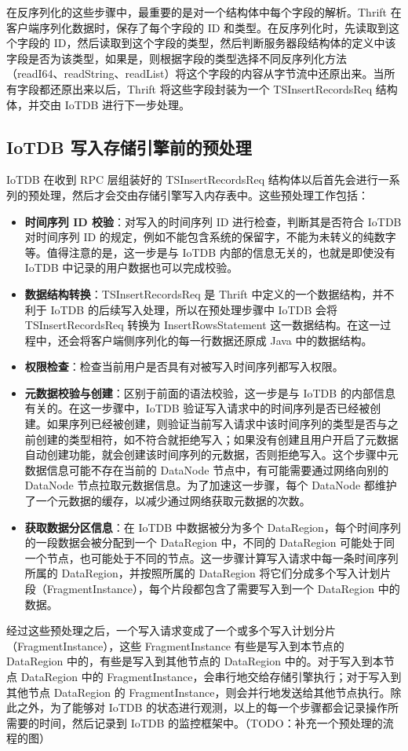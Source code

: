 在反序列化的这些步骤中，最重要的是对一个结构体中每个字段的解析。Thrift 在客户端序列化数据时，保存了每个字段的 ID 和类型。在反序列化时，先读取到这个字段的 ID，然后读取到这个字段的类型，然后判断服务器段结构体的定义中该字段是否为该类型，如果是，则根据字段的类型选择不同反序列化方法（readI64、readString、readList）将这个字段的内容从字节流中还原出来。当所有字段都还原出来以后，Thrift 将这些字段封装为一个 TSInsertRecordsReq 结构体，并交由 IoTDB 进行下一步处理。
\subsection{IoTDB 写入存储引擎前的预处理}
IoTDB 在收到 RPC 层组装好的 TSInsertRecordsReq 结构体以后首先会进行一系列的预处理，然后才会交由存储引擎写入内存表中。这些预处理工作包括：
\begin{itemize}
  \item \textbf{时间序列 ID 校验}：对写入的时间序列 ID 进行检查，判断其是否符合 IoTDB 对时间序列 ID 的规定，例如不能包含系统的保留字，不能为未转义的纯数字等。值得注意的是，这一步是与 IoTDB 内部的信息无关的，也就是即使没有 IoTDB 中记录的用户数据也可以完成校验。
  \item \textbf{数据结构转换}：TSInsertRecordsReq 是 Thrift 中定义的一个数据结构，并不利于 IoTDB 的后续写入处理，所以在预处理步骤中 IoTDB 会将 TSInsertRecordsReq 转换为 InsertRowsStatement 这一数据结构。在这一过程中，还会将客户端侧序列化的每一行数据还原成 Java 中的数据结构。
  \item \textbf{权限检查}：检查当前用户是否具有对被写入时间序列都写入权限。
  \item \textbf{元数据校验与创建}：区别于前面的语法校验，这一步是与 IoTDB 的内部信息有关的。在这一步骤中，IoTDB 验证写入请求中的时间序列是否已经被创建。如果序列已经被创建，则验证当前写入请求中该时间序列的类型是否与之前创建的类型相符，如不符合就拒绝写入；如果没有创建且用户开启了元数据自动创建功能，就会创建该时间序列的元数据，否则拒绝写入。这个步骤中元数据信息可能不存在当前的 DataNode 节点中，有可能需要通过网络向别的 DataNode 节点拉取元数据信息。为了加速这一步骤，每个 DataNode 都维护了一个元数据的缓存，以减少通过网络获取元数据的次数。
  \item \textbf{获取数据分区信息}：在 IoTDB 中数据被分为多个 DataRegion，每个时间序列的一段数据会被分配到一个 DataRegion 中，不同的 DataRegion 可能处于同一个节点，也可能处于不同的节点。这一步骤计算写入请求中每一条时间序列所属的 DataRegion，并按照所属的 DataRegion 将它们分成多个写入计划片段（FragmentInstance），每个片段都包含了需要写入到一个 DataRegion 中的数据。
\end{itemize}
经过这些预处理之后，一个写入请求变成了一个或多个写入计划分片（FragmentInstance），这些 FragmentInstance 有些是写入到本节点的 DataRegion 中的，有些是写入到其他节点的 DataRegion 中的。对于写入到本节点 DataRegion 中的 FragmentInstance，会串行地交给存储引擎执行；对于写入到其他节点 DataRegion 的 FragmentInstance，则会并行地发送给其他节点执行。除此之外，为了能够对 IoTDB 的状态进行观测，以上的每一个步骤都会记录操作所需要的时间，然后记录到 IoTDB 的监控框架中。（TODO：补充一个预处理的流程的图）
